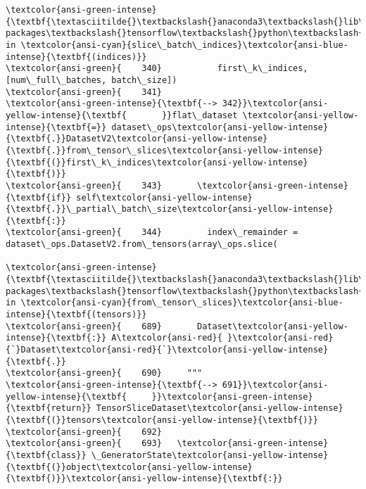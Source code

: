 \documentclass[11pt]{article}
\begin{document}
\begin{Verbatim}[commandchars=\\\{\}, frame=single, framerule=2mm, rulecolor=\color{outerrorbackground}]
\textcolor{ansi-green-intense}{\textbf{\textasciitilde{}\textbackslash{}anaconda3\textbackslash{}lib\textbackslash{}site-packages\textbackslash{}tensorflow\textbackslash{}python\textbackslash{}keras\textbackslash{}engine\textbackslash{}data\_adapter.py}} in \textcolor{ansi-cyan}{slice\_batch\_indices}\textcolor{ansi-blue-intense}{\textbf{(indices)}}
\textcolor{ansi-green}{    340}           first\_k\_indices, [num\_full\_batches, batch\_size])
\textcolor{ansi-green}{    341} 
\textcolor{ansi-green-intense}{\textbf{--> 342}}\textcolor{ansi-yellow-intense}{\textbf{       }}flat\_dataset \textcolor{ansi-yellow-intense}{\textbf{=}} dataset\_ops\textcolor{ansi-yellow-intense}{\textbf{.}}DatasetV2\textcolor{ansi-yellow-intense}{\textbf{.}}from\_tensor\_slices\textcolor{ansi-yellow-intense}{\textbf{(}}first\_k\_indices\textcolor{ansi-yellow-intense}{\textbf{)}}
\textcolor{ansi-green}{    343}       \textcolor{ansi-green-intense}{\textbf{if}} self\textcolor{ansi-yellow-intense}{\textbf{.}}\_partial\_batch\_size\textcolor{ansi-yellow-intense}{\textbf{:}}
\textcolor{ansi-green}{    344}         index\_remainder = dataset\_ops.DatasetV2.from\_tensors(array\_ops.slice(

\textcolor{ansi-green-intense}{\textbf{\textasciitilde{}\textbackslash{}anaconda3\textbackslash{}lib\textbackslash{}site-packages\textbackslash{}tensorflow\textbackslash{}python\textbackslash{}data\textbackslash{}ops\textbackslash{}dataset\_ops.py}} in \textcolor{ansi-cyan}{from\_tensor\_slices}\textcolor{ansi-blue-intense}{\textbf{(tensors)}}
\textcolor{ansi-green}{    689}       Dataset\textcolor{ansi-yellow-intense}{\textbf{:}} A\textcolor{ansi-red}{ }\textcolor{ansi-red}{`}Dataset\textcolor{ansi-red}{`}\textcolor{ansi-yellow-intense}{\textbf{.}}
\textcolor{ansi-green}{    690}     """
\textcolor{ansi-green-intense}{\textbf{--> 691}}\textcolor{ansi-yellow-intense}{\textbf{     }}\textcolor{ansi-green-intense}{\textbf{return}} TensorSliceDataset\textcolor{ansi-yellow-intense}{\textbf{(}}tensors\textcolor{ansi-yellow-intense}{\textbf{)}}
\textcolor{ansi-green}{    692} 
\textcolor{ansi-green}{    693}   \textcolor{ansi-green-intense}{\textbf{class}} \_GeneratorState\textcolor{ansi-yellow-intense}{\textbf{(}}object\textcolor{ansi-yellow-intense}{\textbf{)}}\textcolor{ansi-yellow-intense}{\textbf{:}}


\end{Verbatim}
\end{document}
